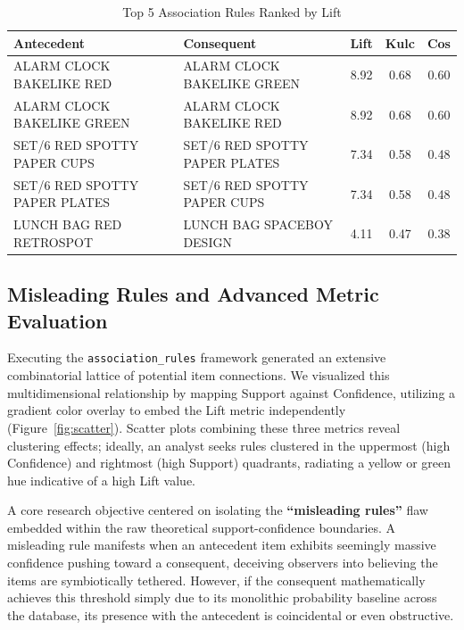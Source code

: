\documentclass[conference]{IEEEtran}
\begin{document}
\begin{table}[htbp]
\caption{Top 5 Association Rules Ranked by Lift}
\begin{center}
\renewcommand{\arraystretch}{1.15}
\footnotesize
\begin{tabular}{@{}p{2.2cm}p{2.2cm}ccc@{}}
\toprule
\textbf{Antecedent} & \textbf{Consequent} & \textbf{Lift} & \textbf{Kulc} & \textbf{Cos} \\
\midrule
ALARM CLOCK BAKELIKE RED & ALARM CLOCK BAKELIKE GREEN & 8.92 & 0.68 & 0.60 \\
ALARM CLOCK BAKELIKE GREEN & ALARM CLOCK BAKELIKE RED & 8.92 & 0.68 & 0.60 \\
SET/6 RED SPOTTY PAPER CUPS & SET/6 RED SPOTTY PAPER PLATES & 7.34 & 0.58 & 0.48 \\
SET/6 RED SPOTTY PAPER PLATES & SET/6 RED SPOTTY PAPER CUPS & 7.34 & 0.58 & 0.48 \\
LUNCH BAG RED RETROSPOT & LUNCH BAG SPACEBOY DESIGN & 4.11 & 0.47 & 0.38 \\
\bottomrule
\end{tabular}
\label{tab:top_rules}
\end{center}
\end{table}

\subsection{Misleading Rules and Advanced Metric Evaluation}
Executing the \texttt{association\_rules} framework generated an extensive combinatorial lattice of potential item connections. We visualized this multidimensional relationship by mapping Support against Confidence, utilizing a gradient color overlay to embed the Lift metric independently (Figure~\ref{fig:scatter}). Scatter plots combining these three metrics reveal clustering effects; ideally, an analyst seeks rules clustered in the uppermost (high Confidence) and rightmost (high Support) quadrants, radiating a yellow or green hue indicative of a high Lift value.

A core research objective centered on isolating the \textbf{``misleading rules''} flaw embedded within the raw theoretical support-confidence boundaries. A misleading rule manifests when an antecedent item exhibits seemingly massive confidence pushing toward a consequent, deceiving observers into believing the items are symbiotically tethered. However, if the consequent mathematically achieves this threshold simply due to its monolithic probability baseline across the database, its presence with the antecedent is coincidental or even obstructive.
\end{document}
